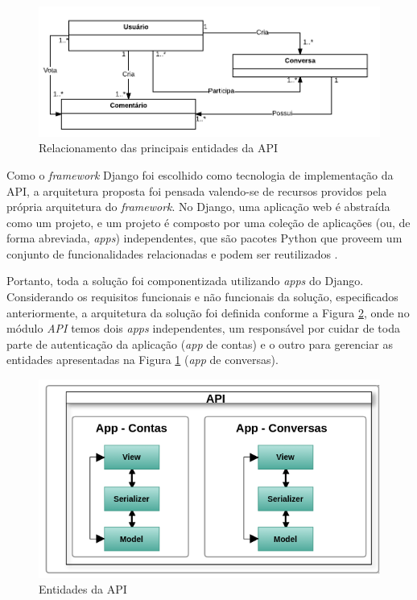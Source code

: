 	\begin{figure}[h!]
	\centering
	\includegraphics[scale=0.5]{figuras/entidades.png}
	\caption{Relacionamento das principais entidades da API}
	\label{fig:entidades}
	\end{figure}

	Como o \textit{framework} Django foi escolhido como tecnologia de implementação da API,
	a arquitetura proposta foi pensada valendo-se de 
	recursos providos pela própria arquitetura do \textit{framework}.
	No Django, uma aplicação web é abstraída como um projeto, e um projeto é composto por uma coleção de aplicações
	(ou, de forma abreviada, \textit{apps}) independentes, que
	são pacotes Python que proveem um conjunto de funcionalidades relacionadas e podem ser reutilizados \cite{django_apps}.

	Portanto, toda a solução foi componentizada utilizando \textit{apps} do 
	Django. Considerando os requisitos funcionais e não funcionais da solução, especificados anteriormente, a arquitetura da solução foi definida 
	conforme a Figura \ref{fig:arquitetura_api}, onde no módulo \textit{API} temos dois \textit{apps} independentes, um responsável
	por cuidar de toda parte de autenticação da aplicação (\textit{app} de contas) e o outro para gerenciar as entidades apresentadas na
	Figura \ref{fig:entidades} (\textit{app} de conversas). 

	\begin{figure}[h!]
	\centering
	\includegraphics[scale=0.8]{figuras/arquitetura_api.png}
	\caption{Entidades da API}
	\label{fig:arquitetura_api}
	\end{figure}

